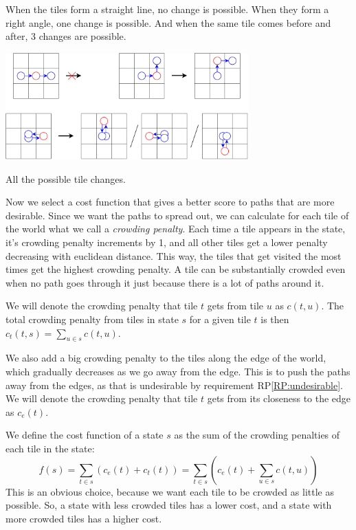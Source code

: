 When the tiles form a straight line, no change is possible.
When they form a right angle, one change is possible.
And when the same tile comes before and after, 3 changes are possible.

\begin{center}
    \captionsetup{type=figure}
    \includegraphics[width=0.7\textwidth]{img/SA tile swaps.pdf}
    \caption{All the possible tile changes.}
    \label{fig:path-tile-swaps}
\end{center}

Now we select a cost function that gives a better score to paths that are more desirable.
Since we want the paths to spread out, we can calculate for each tile of the world what we call a \emph{crowding penalty}.
Each time a tile appears in the state, it's crowding penalty increments by 1, and all other tiles get a lower penalty decreasing with euclidean distance.
This way, the tiles that get visited the most times get the highest crowding penalty.
A tile can be substantially crowded even when no path goes through it just because there is a lot of paths around it.

We will denote the crowding penalty that tile $t$ gets from tile $u$ as $c(t,u)$.
The total crowding penalty from tiles in state $s$ for a given tile $t$ is then $c_t(t,s) = \sum_{u \in s} c(t,u)$.

We also add a big crowding penalty to the tiles along the edge of the world, which gradually decreases as we go away from the edge.
This is to push the paths away from the edges, as that is undesirable by requirement RP\ref{RP:undesirable}.
We will denote the crowding penalty that tile $t$ gets from its closeness to the edge as $c_e(t)$.

We define the cost function of a state $s$ as the sum of the crowding penalties of each tile in the state:
\begin{equation*}
    f(s) = \sum_{t \in s} \left(c_e(t) + c_t(t)\right) = \sum_{t \in s} \left(c_e(t) + \sum_{u \in s} c(t,u) \right)
\end{equation*}
This is an obvious choice, because we want each tile to be crowded as little as possible.
So, a state with less crowded tiles has a lower cost, and a state with more crowded tiles has a higher cost.


